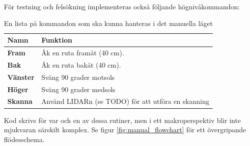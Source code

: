 \documentclass[a4paper,11pt]{article}
\begin{document}
För testning och felsökning implementeras också följande högnivåkommandon: 

\begin{table}[h]
\centering
\begin{tabular}{l|l}
Namn & Funktion\\
\hline
\textbf{Fram} & Åk en ruta framåt (40 cm).\\
\textbf{Bak} & Åk en ruta bakåt (40 cm).\\
\textbf{Vänster} & Sväng 90 grader motsols\\
\textbf{Höger} & Sväng 90 grader medsols\\
\textbf{Skanna} & Använd LIDARn (se TODO) för att utföra en skanning\\
\end{tabular}
\caption{En lista på kommandon som ska kunna hanteras i det manuella läget}
\end{table}

\noindent
Kod skrivs för var och en av dessa rutiner, men i ett makroperspektiv blir inte mjukvaran särskilt komplex. Se figur \ref{fig:manual_flowchart} för ett övergripande flödesschema.
\end{document}

